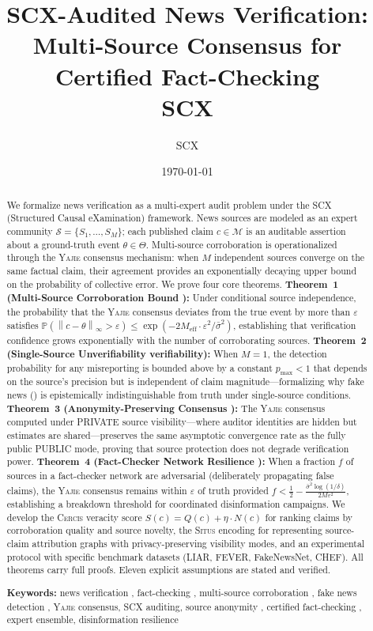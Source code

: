 \documentclass[11pt,a4paper]{article}
\title{\textbf{SCX-Audited News Verification:}\\
\large Multi-Source Consensus for Certified Fact-Checking\\
\small SCX}
\author{SCX}
\date{\today}
\theoremstyle{definition}
\newcommand{\Situs}{\textsc{Situs}}
\newcommand{\Yajie}{\textsc{Yajie}}
\newcommand{\Cercis}{\textsc{Cercis}}
\newcommand{\SCX}{\textsc{SCX}}
\newcommand{\Pbb}{\mathbb{P}}
\newcommand{\norm}[1]{\left\lVert#1\right\rVert}
\newcommand{\claimSpace}{\mathcal{M}}
\newcommand{\sourceSet}{\mathcal{S}}
\newcommand{\newsState}{\Theta}
\newcommand{\VISpublic}{\textsc{PUBLIC}}
\newcommand{\VISprivate}{\textsc{PRIVATE}}
\begin{document}
\maketitle

\begin{abstract}
We formalize news verification as a multi-expert audit problem under the \SCX{} (Structured Causal eXamination) framework. News sources are modeled as an expert community $\sourceSet = \{S_1, \ldots, S_M\}$; each published claim $c \in \claimSpace$ is an auditable assertion about a ground-truth event $\theta \in \newsState$. Multi-source corroboration is operationalized through the \Yajie{} consensus mechanism: when $M$ independent sources converge on the same factual claim, their agreement provides an exponentially decaying upper bound on the probability of collective error. We prove four core theorems. \textbf{Theorem~1 (Multi-Source Corroboration Bound ):} Under conditional source independence, the probability that the \Yajie{} consensus deviates from the true event by more than $\varepsilon$ satisfies $\Pbb(\norm{c - \theta}_\infty > \varepsilon) \leq \exp(-2M_{\mathrm{eff}} \cdot \varepsilon^2 / \bar{\sigma}^2)$, establishing that verification confidence grows exponentially with the number of corroborating sources. \textbf{Theorem~2 (Single-Source Unverifiability verifiability):} When $M = 1$, the detection probability for any misreporting is bounded above by a constant $p_{\max} < 1$ that depends on the source's precision but is independent of claim magnitude---formalizing why fake news () is epistemically indistinguishable from truth under single-source conditions. \textbf{Theorem~3 (Anonymity-Preserving Consensus ):} The \Yajie{} consensus computed under \VISprivate{} source visibility---where auditor identities are hidden but estimates are shared---preserves the same asymptotic convergence rate as the fully public \VISpublic{} mode, proving that source protection does not degrade verification power. \textbf{Theorem~4 (Fact-Checker Network Resilience ):} When a fraction $f$ of sources in a fact-checker network are adversarial (deliberately propagating false claims), the \Yajie{} consensus remains within $\varepsilon$ of truth provided $f < \frac{1}{2} - \frac{\bar{\sigma}^2 \log(1/\delta)}{2M\varepsilon^2}$, establishing a breakdown threshold for coordinated disinformation campaigns. We develop the \Cercis{} veracity score $S(c) = Q(c) + \eta \cdot N(c)$ for ranking claims by corroboration quality and source novelty, the \Situs{} encoding for representing source-claim attribution graphs with privacy-preserving visibility modes, and an experimental protocol with specific benchmark datasets (LIAR, FEVER, FakeNewsNet, CHEF). All theorems carry full proofs. Eleven explicit assumptions are stated and verified.

\medskip
\noindent\textbf{Keywords:} news verification , fact-checking , multi-source corroboration , fake news detection , \Yajie{} consensus, \SCX{} auditing, source anonymity , certified fact-checking , expert ensemble, disinformation resilience
\end{abstract}
\end{document}
